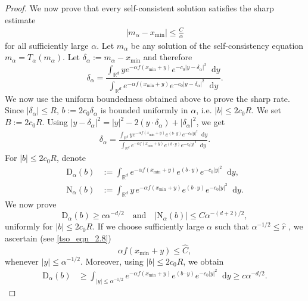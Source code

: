 \documentclass[10pt,a4paper]{amsart}
\newcommand*\der{\mathop{}\!\mathrm{d}}
\begin{document}
\begin{proof}
We now prove that every self-consistent solution satisfies the sharp estimate
\begin{align}
    |m_\alpha-x_{\min}|\le \frac{C}{\alpha}
\end{align}
for all sufficiently large $\alpha$. Let $m_\alpha$ be any solution of the self-consistency equation $ m_\alpha=T_\alpha(m_\alpha)$.  Let $\delta_\alpha:=m_\alpha-x_{\min}$ and therefore
\begin{equation*}
    \delta_\alpha = \frac{
    \int_{\mathbb R^d} y e^{-\alpha f(x_{\min}+y)}e^{-c_0|y-\delta_\alpha|^2}\der y}{ \int_{\mathbb R^d}
    e^{-\alpha f(x_{\min}+y)}
    e^{-c_0|y-\delta_\alpha|^2}\der y}.
\end{equation*}
We now use the uniform boundedness obtained above to prove the sharp rate. Since $|\delta_\alpha|\leq R$, $b:=2c_0\delta_\alpha$
is bounded uniformly in $\alpha$, i.e.
$
    |b|\le 2c_0R.
$ We set $B := 2 c_0 R$. 
Using $|y-\delta_\alpha|^2 = |y|^2-2(y\cdot\delta_\alpha) +|\delta_\alpha|^2$, 
we get
\begin{align*}
    \delta_\alpha = \frac{ \int_{\mathbb R^d}
    y e^{-\alpha f(x_{\min}+y)}
    e^{(b\cdot y)}
    e^{-c_0|y|^2}
    \der y}{    \int_{\mathbb R^d}
    e^{-\alpha f(x_{\min}+y)}
    e^{(b\cdot y)}
    e^{-c_0|y|^2}
    \der y}.
\end{align*}
For $|b|\le 2c_0 R$, denote
\begin{align*}
    \mathrm{D}_\alpha(b)
   & :=
    \int_{\mathbb R^d}
    e^{-\alpha f(x_{\min}+y)}
    e^{(b\cdot y)}
    e^{-c_0|y|^2}
    \der y,\\ 
    \mathrm{N}_\alpha(b)
   & :=
    \int_{\mathbb R^d}
    y\,e^{-\alpha f(x_{\min}+y)}
    e^{(b\cdot y)}
    e^{-c_0|y|^2}
    \der y.
\end{align*}
We now prove
\begin{equation}
    \mathrm{D}_\alpha(b)\ge c\alpha^{-d/2}\quad \text{and}\quad
    |\mathrm{N}_\alpha(b)|\le C\alpha^{-(d+2)/2},
\end{equation}
uniformly for $|b|\le 2c_0 R$. If we choose sufficiently large $\alpha $ such that $\alpha^{-1/2} \leq \hat{r}$ , we ascertain (see \eqref{tso_eqn_2.8})
\begin{equation*}
    \alpha f(x_{\min}+y)\le \hat C,
\end{equation*}
whenever $|y| \leq \alpha^{-1/2}$. Moreover, using $|b|\le 2c_0 R$, we obtain
\begin{align}\label{tso_eqn_2.29}
    \mathrm{D}_\alpha(b)
    &\ge
    \int_{|y|\le \alpha^{-1/2}}
    e^{-\alpha f(x_{\min}+y)}
    e^{(b\cdot y)}
    e^{-c_0|y|^2} \der y     \geq     c\alpha^{-d/2}.
\end{align}



\end{proof}
\end{document}
